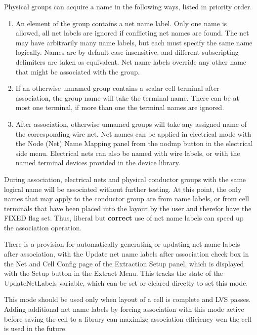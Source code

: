 Physical groups can acquire a name in the following ways, listed
in priority order.
\begin{enumerate}
\item{An element of the group contains a net name label.  Only one
name is allowed, all net labels are ignored if conflicting net names
are found.  The net may have arbitrarily many name labels, but each
must specify the same name logically.  Names are by default
case-insensitive, and different subscripting delimiters are taken as
equivalent.  Net name labels override any other name that might be
associated with the group.}

\item{If an otherwise unnamed group contains a scalar cell terminal
after association, the group name will take the terminal name.  There
can be at most one terminal, if more than one the terminal names are
ignored.}

\item{After association, otherwise unnamed groups will take any
assigned name of the corresponding wire net.  Net names can be applied
in electrical mode with the {\cb Node (Net) Name Mapping} panel from
the {\cb nodmp} button in the electrical side menu.  Electrical nets
can also be named with wire labels, or with the named terminal devices
provided in the device library.}
\end{enumerate}

During association, electrical nets and physical conductor groups with
the same logical name will be associated without further testing.  At
this point, the only names that may apply to the conductor group are
from name labels, or from cell terminals that have been placed into
the layout by the user and therefor have the {\et FIXED} flag set. 
Thus, liberal but {\bf correct} use of net name labels can speed up
the association operation.

There is a provision for automatically generating or updating net name
labels after association, with the {\cb Update net name labels after
association} check box in the {\cb Net and Cell Config} page of the
{\cb Extraction Setup} panel, which is displayed with the {\cb Setup}
button in the {\cb Extract Menu}.  This tracks the state of the {\et
UpdateNetLabels} variable, which can be set or cleared directly to set
this mode.

This mode should be used only when layout of a cell is complete and
LVS passes.  Adding additional net name labels by forcing association
with this mode active before saving the cell to a library can maximize
association efficiency wen the cell is used in the future.

